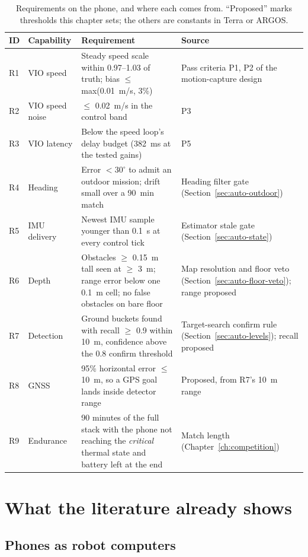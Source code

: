 \begin{table}[ht]
\centering
\caption{Requirements on the phone, and where each comes from. ``Proposed'' marks thresholds this chapter sets; the others are constants in Terra or ARGOS.}
\label{tab:phone-req}
\small
\begin{tabularx}{\textwidth}{@{}l l X X@{}}
\toprule
ID & Capability & Requirement & Source \\
\midrule
R1 & VIO speed & Steady speed scale within 0.97--1.03 of truth; bias $\le$ max(0.01~m/s, 3\%) & Pass criteria P1, P2 of the motion-capture design \\
R2 & VIO speed noise & $\le$ 0.02~m/s in the control band & P3 \\
R3 & VIO latency & Below the speed loop's delay budget (382~ms at the tested gains) & P5 \\
R4 & Heading & Error $< 30^\circ$ to admit an outdoor mission; drift small over a 90~min match & Heading filter gate (Section~\ref{sec:auto-outdoor}) \\
R5 & IMU delivery & Newest IMU sample younger than 0.1~s at every control tick & Estimator stale gate (Section~\ref{sec:auto-state}) \\
R6 & Depth & Obstacles $\ge$ 0.15~m tall seen at $\ge$ 3~m; range error below one 0.1~m cell; no false obstacles on bare floor & Map resolution and floor veto (Section~\ref{sec:auto-floor-veto}); range proposed \\
R7 & Detection & Ground buckets found with recall $\ge$ 0.9 within 10~m, confidence above the 0.8 confirm threshold & Target-search confirm rule (Section~\ref{sec:auto-levels}); recall proposed \\
R8 & GNSS & 95\% horizontal error $\le$ 10~m, so a GPS goal lands inside detector range & Proposed, from R7's 10~m range \\
R9 & Endurance & 90 minutes of the full stack with the phone not reaching the \emph{critical} thermal state and battery left at the end & Match length (Chapter~\ref{ch:competition}) \\
\bottomrule
\end{tabularx}
\end{table}

\section{What the literature already shows}
\label{sec:phone-lit}

\subsection{Phones as robot computers}

